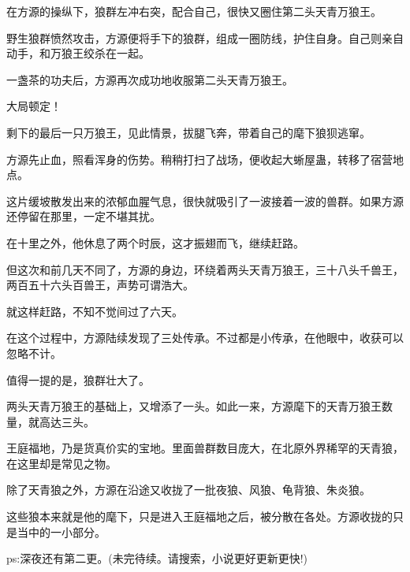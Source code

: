 \begin{this_body}
在方源的操纵下，狼群左冲右突，配合自己，很快又圈住第二头天青万狼王。

野生狼群愤然攻击，方源便将手下的狼群，组成一圈防线，护住自身。自己则亲自动手，和万狼王绞杀在一起。

一盏茶的功夫后，方源再次成功地收服第二头天青万狼王。

大局顿定！

剩下的最后一只万狼王，见此情景，拔腿飞奔，带着自己的麾下狼狈逃窜。

方源先止血，照看浑身的伤势。稍稍打扫了战场，便收起大蜥屋蛊，转移了宿营地点。

这片缓坡散发出来的浓郁血腥气息，很快就吸引了一波接着一波的兽群。如果方源还停留在那里，一定不堪其扰。

在十里之外，他休息了两个时辰，这才振翅而飞，继续赶路。

但这次和前几天不同了，方源的身边，环绕着两头天青万狼王，三十八头千兽王，两百五十六头百兽王，声势可谓浩大。

就这样赶路，不知不觉间过了六天。

在这个过程中，方源陆续发现了三处传承。不过都是小传承，在他眼中，收获可以忽略不计。

值得一提的是，狼群壮大了。

两头天青万狼王的基础上，又增添了一头。如此一来，方源麾下的天青万狼王数量，就高达三头。

王庭福地，乃是货真价实的宝地。里面兽群数目庞大，在北原外界稀罕的天青狼，在这里却是常见之物。

除了天青狼之外，方源在沿途又收拢了一批夜狼、风狼、龟背狼、朱炎狼。

这些狼本来就是他的麾下，只是进入王庭福地之后，被分散在各处。方源收拢的只是当中的一小部分。

ps:深夜还有第二更。(未完待续。请搜索，小说更好更新更快!)

\end{this_body}

